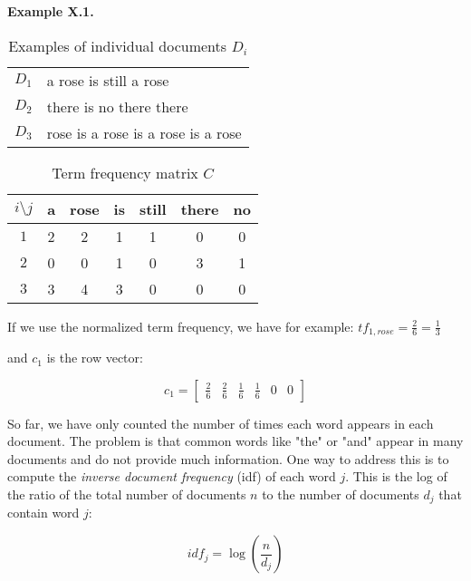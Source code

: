\begin{examplebox}
    \textbf{Example X.1.} 
\begin{table}[H]
    \centering
    \begin{tabular}{|c|p{5cm}|}
        $D_1$ & a rose is still a rose \\
        $D_2$ & there is no there there \\
        $D_3$ & rose is a rose is a rose is a rose \\
    \end{tabular}
    \caption{Examples of individual documents $D_i$}
\end{table}

\begin{table}[H]
    \centering
    \begin{tabular}{c|c|c|c|c|c|c}
        $i\setminus j$ & a & rose & is & still & there & no \\
        \hline
        $1$ & 2 & 2 & 1 & 1 & 0 & 0 \\
        $2$ & 0 & 0 & 1 & 0 & 3 & 1  \\
        $3$ & 3 & 4 & 3 & 0 & 0 & 0  \\
    \end{tabular}
    \caption{Term frequency matrix $C$}
\end{table}

If we use the normalized term frequency, we have
for example:
$tf_{1,rose} = \frac{2}{6} = \frac{1}{3}$ 

and $c_1$ is the row vector:

\begin{equation}
    c_1 = \begin{bmatrix}
        \frac{2}{6} & \frac{2}{6} & \frac{1}{6} & \frac{1}{6} & 0 & 0
    \end{bmatrix}
\end{equation}
\end{examplebox}

So far, we have only counted 
the number of times each word appears in each document.
The problem is that common words like "the" or "and"
appear in many documents and do not provide much information.
One way to address this is to compute the 
\textit{inverse document frequency} (idf) of each word $j$.
This is the log of the ratio of the total number of documents $n$ 
to the number of documents $d_j$ 
that contain word $j$:

\begin{equation}
idf_{j} = \log (\frac{n}{d_j})
\end{equation}

